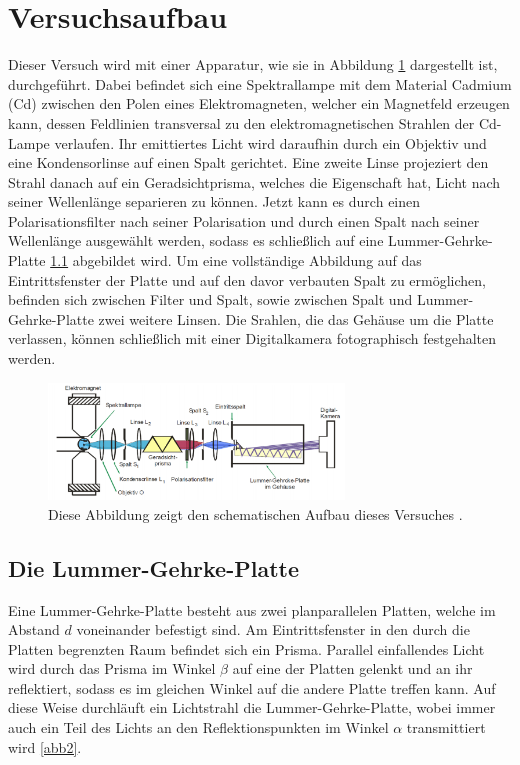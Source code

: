 \section{Versuchsaufbau}
\label{sec:Versuchsaufbau}

Dieser Versuch wird mit einer Apparatur, wie sie in 
Abbildung \ref{abb1} dargestellt ist, durchgeführt.
Dabei befindet sich eine Spektrallampe mit dem Material 
Cadmium (Cd) zwischen den Polen eines Elektromagneten, 
welcher ein Magnetfeld erzeugen kann, dessen Feldlinien 
transversal zu den elektromagnetischen Strahlen der 
Cd-Lampe verlaufen.
Ihr emittiertes Licht wird daraufhin durch ein Objektiv und 
eine Kondensorlinse auf einen Spalt gerichtet. Eine zweite 
Linse projeziert den Strahl danach auf ein Geradsichtprisma, 
welches die Eigenschaft hat, Licht nach seiner 
Wellenlänge separieren zu können. Jetzt kann es durch einen 
Polarisationsfilter nach seiner Polarisation und durch einen 
Spalt nach seiner Wellenlänge ausgewählt werden, sodass es 
schließlich auf eine Lummer-Gehrke-Platte \ref{LGP} abgebildet 
wird. Um eine vollständige Abbildung auf das Eintrittsfenster
der Platte und auf den davor verbauten Spalt zu ermöglichen, 
befinden sich zwischen Filter und Spalt, sowie zwischen 
Spalt und Lummer-Gehrke-Platte zwei weitere Linsen. 
Die Srahlen, die das Gehäuse um die Platte verlassen,
können schließlich mit einer Digitalkamera fotographisch 
festgehalten werden.

\begin{figure}
    \centering
    \includegraphics[width=0.7\textwidth]{figure/Aufbau.pdf}
    \caption{Diese Abbildung zeigt den schematischen Aufbau dieses Versuches \cite{sample}.}
    \label{abb1}
\end{figure}

\subsection{Die Lummer-Gehrke-Platte}
\label{LGP}

Eine Lummer-Gehrke-Platte besteht aus zwei planparallelen 
Platten, welche im Abstand $d$ voneinander befestigt sind.
Am Eintrittsfenster in den durch die Platten begrenzten Raum 
befindet sich ein Prisma. Parallel einfallendes Licht
wird durch das Prisma im Winkel $\beta$ auf eine der Platten 
gelenkt und an ihr reflektiert, sodass es im gleichen Winkel 
auf die andere Platte treffen kann. Auf diese Weise durchläuft 
ein Lichtstrahl die Lummer-Gehrke-Platte, wobei immer auch
ein Teil des Lichts an den Reflektionspunkten im Winkel $\alpha$ transmittiert wird \ref{abb2}.

